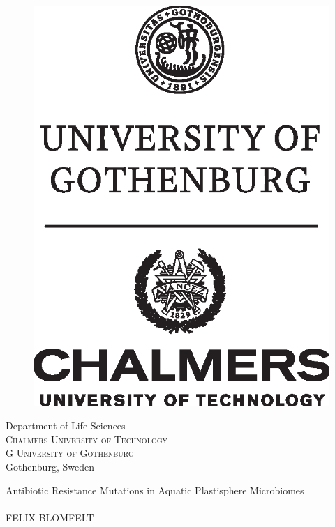 \begin{center}
\begin{figure}[H]
        \includegraphics[width=0.3\pdfpagewidth]{figure/auxiliary/chalmers_gu_black_centered_eng.eps} \\
        \fi
    \end{figure}
    \vspace{5mm}
    Department of Life Sciences \\
    \textsc{Chalmers University of Technology} \\
    \if\InstitutionLocation G
    \textsc{University of Gothenburg} \\
    \fi
    Gothenburg, Sweden \the\year \\
\end{center}


\newpage
\thispagestyle{plain}
\vspace*{4.5cm}
Antibiotic Resistance Mutations in Aquatic Plastisphere Microbiomes\\
\\
FELIX BLOMFELT \setlength{\parskip}{1cm}

